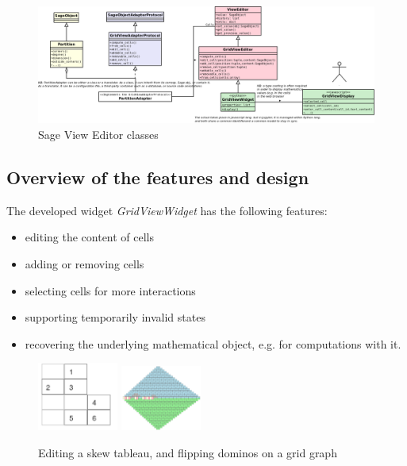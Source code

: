 \documentclass{deliverablereport}
\begin{document}
\begin{landscape}
\begin{figure}[h]
  \begin{center}
    \includegraphics[width=1.4\textheight]{schemas/SageViewEditor}
  \end{center}
  \caption{Sage View Editor classes}
  \label{fig:schema}
\end{figure}
\end{landscape}

\subsection{Overview of the features and design}

The developed \Jupyter widget \emph{GridViewWidget} has the following
features:
\begin{itemize}
\item editing the content of cells
\item adding or removing cells
\item selecting cells for more interactions
\item supporting temporarily invalid states
\item recovering the underlying mathematical object, e.g. for
  computations with it.
\end{itemize}

\begin{figure}
  \begin{center}
    \includegraphics[width=100px]{images/SkewTableauWidget}
    \qquad
    \includegraphics[width=100px]{images/dominos-azteque}
  \end{center}
  \caption{Editing a skew tableau, and flipping dominos on a grid graph}
\end{figure}
\end{document}
